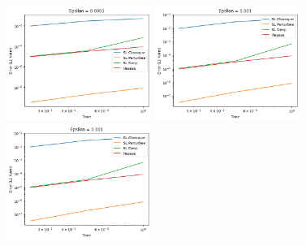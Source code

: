 \documentclass{article}
\begin{document}
\begin{figure}[!h]
    \centering
    \includegraphics[width=0.42\textwidth]{images/20ep11.png}
    \includegraphics[width=0.42\textwidth]{images/20ep12.png}
    \includegraphics[width=0.42\textwidth]{images/20ep13.png}
\end{figure}
\end{document}
